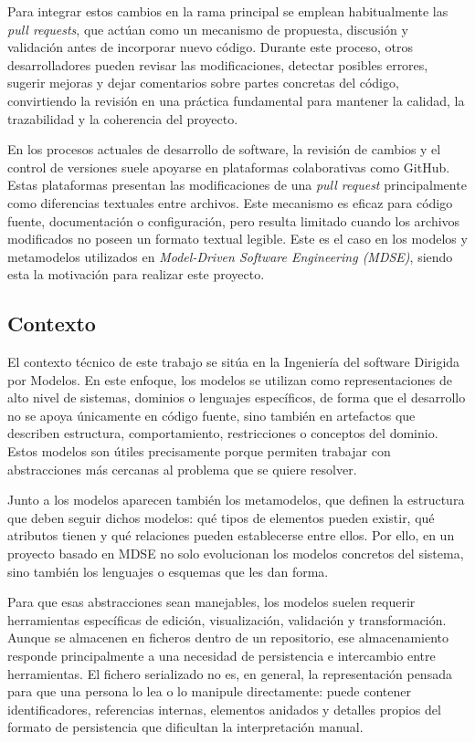 \documentclass[11pt]{article}
\begin{document}
Para integrar estos cambios en la rama principal se emplean habitualmente las \textit{pull requests}, que actúan como un mecanismo de propuesta, discusión y validación antes de incorporar nuevo código. Durante este proceso, otros desarrolladores pueden revisar las modificaciones, detectar posibles errores, sugerir mejoras y dejar comentarios sobre partes concretas del código, convirtiendo la revisión en una práctica fundamental para mantener la calidad, la trazabilidad y la coherencia del proyecto.

En los procesos actuales de desarrollo de software, la revisión de cambios y el control de versiones suele apoyarse en plataformas colaborativas como GitHub. Estas plataformas presentan las modificaciones de una \textit{pull request} principalmente como diferencias textuales entre archivos. Este mecanismo es eficaz para código fuente, documentación o configuración, pero resulta limitado cuando los archivos modificados no poseen un formato textual legible. Este es el caso en los modelos y metamodelos utilizados en \textit{Model-Driven Software Engineering (MDSE)}, siendo esta la motivación para realizar este proyecto.

\subsection{Contexto}

El contexto técnico de este trabajo se sitúa en la Ingeniería del software Dirigida por Modelos. En este enfoque, los modelos se utilizan como representaciones de alto nivel de sistemas, dominios o lenguajes específicos, de forma que el desarrollo no se apoya únicamente en código fuente, sino también en artefactos que describen estructura, comportamiento, restricciones o conceptos del dominio. Estos modelos son útiles precisamente porque permiten trabajar con abstracciones más cercanas al problema que se quiere resolver.

Junto a los modelos aparecen también los metamodelos, que definen la estructura que deben seguir dichos modelos: qué tipos de elementos pueden existir, qué atributos tienen y qué relaciones pueden establecerse entre ellos. Por ello, en un proyecto basado en MDSE no solo evolucionan los modelos concretos del sistema, sino también los lenguajes o esquemas que les dan forma.

Para que esas abstracciones sean manejables, los modelos suelen requerir herramientas específicas de edición, visualización, validación y transformación. Aunque se almacenen en ficheros dentro de un repositorio, ese almacenamiento responde principalmente a una necesidad de persistencia e intercambio entre herramientas. El fichero serializado no es, en general, la representación pensada para que una persona lo lea o lo manipule directamente: puede contener identificadores, referencias internas, elementos anidados y detalles propios del formato de persistencia que dificultan la interpretación manual.
\end{document}
